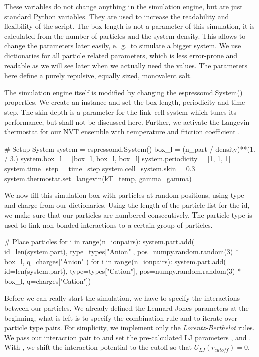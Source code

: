 \documentclass[
a4paper,                        %
11pt,                           %
twoside,                        %
footsepline,                    %
headsepline,                    %
headexclude,                    %
footexclude,                    %
pagesize,                       %
]{scrartcl}
\begin{document}
These variables do not change anything in the simulation engine, but
are just standard Python variables. They are used to increase the
readability and flexibility of the script. The box length is not a
parameter of this simulation, it is calculated from the number of
particles and the system density. This allows to change the parameters
later easily, e.~g.\ to simulate a bigger system.
We use dictionaries for all particle related parameters, which is less error-prone and
readable as we will see later when we actually need the values. The parameters here define a purely repulsive, 
equally sized, monovalent salt.

The simulation engine itself is modified by changing the
espressomd.System() properties. We create an instance  and
set the box length, periodicity and time step. The skin depth  
is a parameter for the link--cell system which tunes its
performance, but shall not be discussed here. Further, we activate the Langevin thermostat
for our NVT ensemble with temperature  and friction coefficient . 


\begin{pypresso}
# Setup System
system = espressomd.System()
box_l = (n_part / density)**(1. / 3.)
system.box_l = [box_l, box_l, box_l]
system.periodicity = [1, 1, 1]
system.time_step = time_step
system.cell_system.skin = 0.3
system.thermostat.set_langevin(kT=temp, gamma=gamma)
\end{pypresso}

We now fill this simulation box with particles at random positions, using type and charge from our dictionaries.
Using the length of the particle list  for the id, we make sure that our particles are numbered consecutively.
The particle type is used to link non-bonded interactions to a certain group of particles.

\begin{pypresso}
# Place particles
for i in range(n_ionpairs):
    system.part.add(
            id=len(system.part), 
            type=types["Anion"],  
            pos=numpy.random.random(3) * box_l, 
            q=charges["Anion"])
for i in range(n_ionpairs):
    system.part.add(
            id=len(system.part), 
            type=types["Cation"], 
            pos=numpy.random.random(3) * box_l, 
            q=charges["Cation"])
\end{pypresso}

Before we can really start the simulation, we have to specify the
interactions between our particles. We already defined the Lennard-Jones parameters at the beginning,
what is left is to specify the combination rule and to iterate over particle type pairs. For simplicity, 
we implement only the \emph{Lorentz-Berthelot} rules. 
We pass our interaction pair to  and set the 
pre-calculated LJ parameters ,  and . With ,
we shift the interaction potential to the cutoff so that $U_{LJ}(r_{cutoff})=0$.
\end{document}
